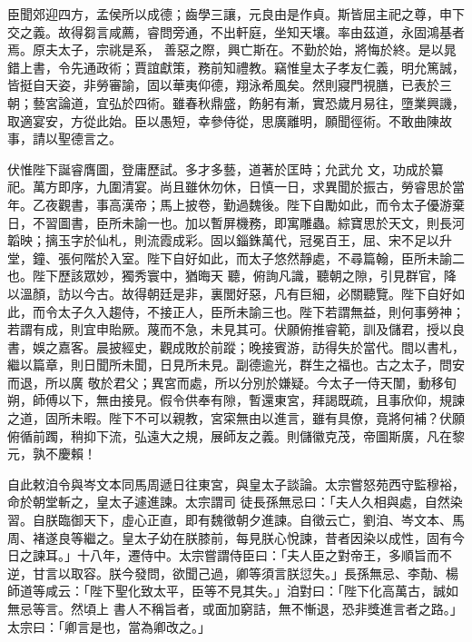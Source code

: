 \begin{pinyinscope}
 臣聞郊迎四方，孟侯所以成德；齒學三讓，元良由是作貞。斯皆屈主祀之尊，申下交之義。故得芻言咸薦，睿問旁通，不出軒庭，坐知天壤。率由茲道，永固鴻基者焉。原夫太子，宗祧是系，
 善惡之際，興亡斯在。不勤於始，將悔於終。是以晁錯上書，令先通政術；賈誼獻策，務前知禮教。竊惟皇太子孝友仁義，明允篤誠，皆挺自天姿，非勞審諭，固以華夷仰德，翔泳希風矣。然則寢門視膳，已表於三朝；藝宮論道，宜弘於四術。雖春秋鼎盛，飭躬有漸，實恐歲月易往，墮業興譏，取適宴安，方從此始。臣以愚短，幸參侍從，思廣離明，願聞徑術。不敢曲陳故事，請以聖德言之。



 伏惟陛下誕睿膺圖，登庸歷試。多才多藝，道著於匡時；允武允
 文，功成於纂祀。萬方即序，九圍清宴。尚且雖休勿休，日慎一日，求異聞於振古，勞睿思於當年。乙夜觀書，事高漢帝；馬上披卷，勤過魏後。陛下自勵如此，而令太子優游棄日，不習圖書，臣所未諭一也。加以暫屏機務，即寓雕蟲。綜寶思於天文，則長河韜映；摛玉字於仙札，則流霞成彩。固以錙銖萬代，冠冕百王，屈、宋不足以升堂，鐘、張何階於入室。陛下自好如此，而太子悠然靜處，不尋篇翰，臣所未諭二也。陛下歷該眾妙，獨秀寰中，猶晦天
 聽，俯詢凡識，聽朝之隙，引見群官，降以溫顏，訪以今古。故得朝廷是非，裏閭好惡，凡有巨細，必關聽覽。陛下自好如此，而令太子久入趨侍，不接正人，臣所未諭三也。陛下若謂無益，則何事勞神；若謂有成，則宜申貽厥。蔑而不急，未見其可。伏願俯推睿範，訓及儲君，授以良書，娛之嘉客。晨披經史，觀成敗於前蹤；晚接賓游，訪得失於當代。間以書札，繼以篇章，則日聞所未聞，日見所未見。副德逾光，群生之福也。古之太子，問安而退，所以廣
 敬於君父；異宮而處，所以分別於嫌疑。今太子一侍天闈，動移旬朔，師傅以下，無由接見。假令供奉有隙，暫還東宮，拜謁既疏，且事欣仰，規諫之道，固所未暇。陛下不可以親教，宮寀無由以進言，雖有具僚，竟將何補？伏願俯循前躅，稍抑下流，弘遠大之規，展師友之義。則儲徽克茂，帝圖斯廣，凡在黎元，孰不慶賴！



 自此敕洎令與岑文本同馬周遞日往東宮，與皇太子談論。太宗嘗怒苑西守監穆裕，命於朝堂斬之，皇太子遽進諫。太宗謂司
 徒長孫無忌曰：「夫人久相與處，自然染習。自朕臨御天下，虛心正直，即有魏徵朝夕進諫。自徵云亡，劉洎、岑文本、馬周、褚遂良等繼之。皇太子幼在朕膝前，每見朕心悅諫，昔者因染以成性，固有今日之諫耳。」十八年，遷侍中。太宗嘗謂侍臣曰：「夫人臣之對帝王，多順旨而不逆，甘言以取容。朕今發問，欲聞己過，卿等須言朕愆失。」長孫無忌、李勣、楊師道等咸云：「陛下聖化致太平，臣等不見其失。」洎對曰：「陛下化高萬古，誠如無忌等言。然頃上
 書人不稱旨者，或面加窮詰，無不慚退，恐非獎進言者之路。」太宗曰：「卿言是也，當為卿改之。」




\end{pinyinscope}

